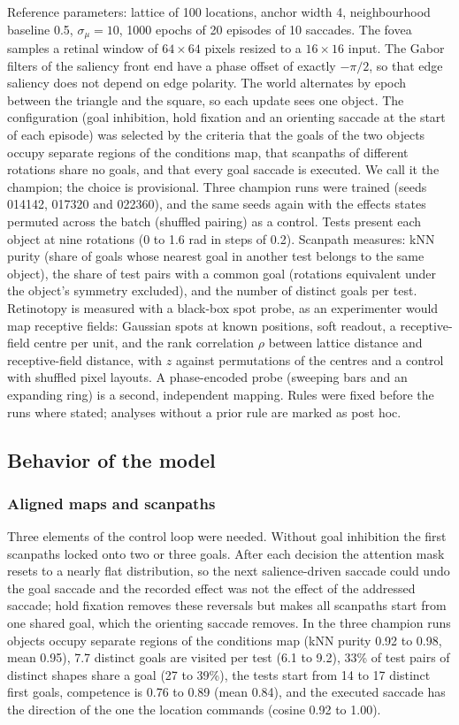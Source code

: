 \documentclass[14pt]{article}
\begin{document}
Reference parameters: lattice of 100 locations, anchor width 4, neighbourhood baseline 0.5, $\sigma_\mu=10$, 1000 epochs of 20 episodes of 10 saccades.
The fovea samples a retinal window of $64\times64$ pixels resized to a $16\times16$ input.
The Gabor filters of the saliency front end have a phase offset of exactly $-\pi/2$, so that edge saliency does not depend on edge polarity.
The world alternates by epoch between the triangle and the square, so each update sees one object.
The configuration (goal inhibition, hold fixation and an orienting saccade at the start of each episode) was selected by the criteria that the goals of the two objects occupy separate regions of the conditions map, that scanpaths of different rotations share no goals, and that every goal saccade is executed.
We call it the champion; the choice is provisional.
Three champion runs were trained (seeds 014142, 017320 and 022360), and the same seeds again with the effects states permuted across the batch (shuffled pairing) as a control.
Tests present each object at nine rotations (0 to 1.6 rad in steps of 0.2).
Scanpath measures: kNN purity (share of goals whose nearest goal in another test belongs to the same object), the share of test pairs with a common goal (rotations equivalent under the object's symmetry excluded), and the number of distinct goals per test.
Retinotopy is measured with a black-box spot probe, as an experimenter would map receptive fields: Gaussian spots at known positions, soft readout, a receptive-field centre per unit, and the rank correlation $\rho$ between lattice distance and receptive-field distance, with $z$ against permutations of the centres and a control with shuffled pixel layouts.
A phase-encoded probe (sweeping bars and an expanding ring) is a second, independent mapping.
Rules were fixed before the runs where stated; analyses without a prior rule are marked as post hoc.

\subsection{Behavior of the model}

\subsubsection{Aligned maps and scanpaths}

Three elements of the control loop were needed.
Without goal inhibition the first scanpaths locked onto two or three goals.
After each decision the attention mask resets to a nearly flat distribution, so the next salience-driven saccade could undo the goal saccade and the recorded effect was not the effect of the addressed saccade; hold fixation removes these reversals but makes all scanpaths start from one shared goal, which the orienting saccade removes.
In the three champion runs objects occupy separate regions of the conditions map (kNN purity 0.92 to 0.98, mean 0.95), 7.7 distinct goals are visited per test (6.1 to 9.2), 33\% of test pairs of distinct shapes share a goal (27 to 39\%), the tests start from 14 to 17 distinct first goals, competence is 0.76 to 0.89 (mean 0.84), and the executed saccade has the direction of the one the location commands (cosine 0.92 to 1.00).
\end{document}
